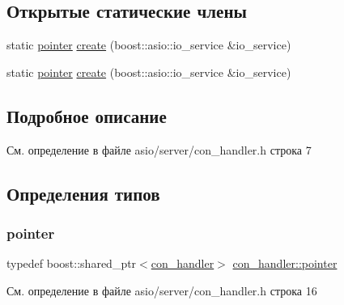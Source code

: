 \subsection*{Открытые статические члены}
\begin{DoxyCompactItemize}
\item 
static \mbox{\hyperlink{classcon__handler_ada4a1b970f9fd8e55460a58cf7f7ce2c}{pointer}} \mbox{\hyperlink{classcon__handler_ab3cec40540ef3ff484ef0b639545eb17}{create}} (boost\+::asio\+::io\+\_\+service \&io\+\_\+service)
\item 
static \mbox{\hyperlink{classcon__handler_ada4a1b970f9fd8e55460a58cf7f7ce2c}{pointer}} \mbox{\hyperlink{classcon__handler_ab3cec40540ef3ff484ef0b639545eb17}{create}} (boost\+::asio\+::io\+\_\+service \&io\+\_\+service)
\end{DoxyCompactItemize}


\subsection{Подробное описание}


См. определение в файле asio/server/con\+\_\+handler.\+h строка 7



\subsection{Определения типов}
\mbox{\label{classcon__handler_ada4a1b970f9fd8e55460a58cf7f7ce2c}} 
\subsubsection{\texorpdfstring{pointer}{pointer}\hspace{0.1cm}{\footnotesize\ttfamily [1/2]}}
{\footnotesize\ttfamily typedef boost\+::shared\+\_\+ptr$<$\mbox{\hyperlink{classcon__handler}{con\+\_\+handler}}$>$ \mbox{\hyperlink{classcon__handler_ada4a1b970f9fd8e55460a58cf7f7ce2c}{con\+\_\+handler\+::pointer}}}



См. определение в файле asio/server/con\+\_\+handler.\+h строка 16

\mbox{\label{classcon__handler_ada4a1b970f9fd8e55460a58cf7f7ce2c}} 
